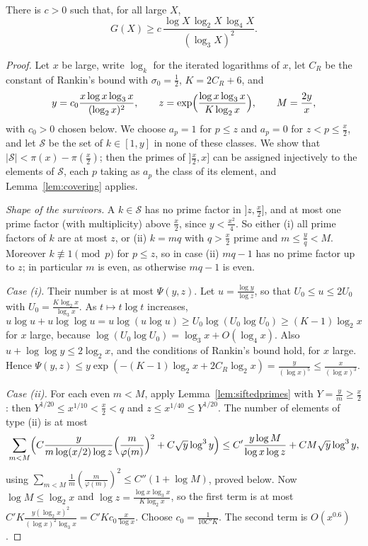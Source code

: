 \begin{theorem}\label{thm:erdosrankin}
There is $c>0$ such that, for all large $X$,
\[
G(X)\ge c\,\frac{\log X\,\log_2X\,\log_4X}{(\log_3X)^2}.
\]
\end{theorem}
\begin{proof}
Let $x$ be large, write $\log_k$ for the iterated logarithms of $x$, let $C_R$ be the constant of Rankin's bound with $\sigma_0=\frac12$, $K=2C_R+6$, and
\[
y=c_0\frac{x\log x\log_3x}{(\log_2x)^2},\qquad z=\exp\Bigl(\frac{\log x\log_3x}{K\log_2x}\Bigr),\qquad M=\frac{2y}x,
\]
with $c_0>0$ chosen below. We choose $a_p=1$ for $p\le z$ and $a_p=0$ for $z<p\le\frac x2$, and let $\mathcal S$ be the set of $k\in[1,y]$ in none of these classes. We show that $|\mathcal S|<\pi(x)-\pi(\frac x2)$; then the primes of $]\frac x2,x]$ can be assigned injectively to the elements of $\mathcal S$, each $p$ taking as $a_p$ the class of its element, and Lemma~\ref{lem:covering} applies.

\emph{Shape of the survivors.} A $k\in\mathcal S$ has no prime factor in $]z,\frac x2]$, and at most one prime factor (with multiplicity) above $\frac x2$, since $y<\frac{x^2}4$. So either (i) all prime factors of $k$ are at most $z$, or (ii) $k=mq$ with $q>\frac x2$ prime and $m\le\frac yq<M$. Moreover $k\not\equiv1\pmod p$ for $p\le z$, so in case (ii) $mq-1$ has no prime factor up to $z$; in particular $m$ is even, as otherwise $mq-1$ is even.

\emph{Case (i).} Their number is at most $\Psi(y,z)$. Let $u=\frac{\log y}{\log z}$, so that $U_0\le u\le2U_0$ with $U_0=\frac{K\log_2x}{\log_3x}$. As $t\mapsto t\log t$ increases,
\[
u\log u+u\log\log u=u\log(u\log u)\ge U_0\log(U_0\log U_0)\ge(K-1)\log_2x
\]
for $x$ large, because $\log(U_0\log U_0)=\log_3x+O(\log_4x)$. Also $u+\log\log y\le2\log_2x$, and the conditions of Rankin's bound hold, for $x$ large. Hence $\Psi(y,z)\le y\exp(-(K-1)\log_2x+2C_R\log_2x)=\frac y{(\log x)^5}\le\frac x{(\log x)^3}$.

\emph{Case (ii).} For each even $m<M$, apply Lemma~\ref{lem:siftedprimes} with $Y=\frac ym\ge\frac x2$: then $Y^{1/20}\le x^{1/10}<\frac x2<q$ and $z\le x^{1/40}\le Y^{1/20}$. The number of elements of type (ii) is at most
\[
\sum_{m<M}\Bigl(C\frac{y}{m\log(x/2)\log z}\Bigl(\frac m{\varphi(m)}\Bigr)^2+C\sqrt y\log^3y\Bigr)\le C'\frac{y\log M}{\log x\log z}+CM\sqrt y\log^3y,
\]
using $\sum_{m<M}\frac1m(\frac m{\varphi(m)})^2\le C''(1+\log M)$, proved below. Now $\log M\le\log_2x$ and $\log z=\frac{\log x\log_3x}{K\log_2x}$, so the first term is at most $C'K\frac{y(\log_2x)^2}{(\log x)^2\log_3x}=C'Kc_0\frac x{\log x}$. Choose $c_0=\frac1{10C'K}$. The second term is $O(x^{0.6})$.


\end{proof}
